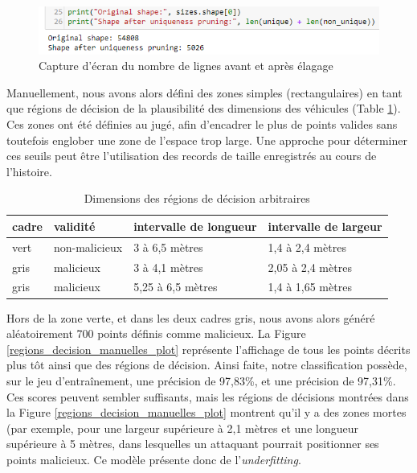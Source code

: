 \documentclass[a4paper]{report}
\begin{document}
\begin{figure}
\centering
\includegraphics[width=\textwidth]{img/screen_shape.png}
\caption{Capture d'écran du nombre de lignes avant et après élagage\label{screen_shape}}
\end{figure}

Manuellement, nous avons alors défini des zones simples (rectangulaires) en tant que régions de décision de la plausibilité des dimensions des véhicules (Table \ref{regions_decision_manuelles_valeurs}). Ces zones ont été définies au jugé, afin d'encadrer le plus de points valides sans toutefois englober une zone de l'espace trop large. Une approche pour déterminer ces seuils peut être l'utilisation des records de taille enregistrés au cours de l'histoire.

\begin{table}[h]
\centering
\begin{tabular}{llll}
cadre & validité & intervalle de longueur & intervalle de largeur \\
\hline
vert & non-malicieux & 3 à 6,5 mètres & 1,4 à 2,4 mètres \\
gris & malicieux & 3 à 4,1 mètres & 2,05 à 2,4 mètres \\
gris & malicieux & 5,25 à 6,5 mètres & 1,4 à 1,65 mètres \\
\end{tabular}
\caption{Dimensions des régions de décision arbitraires\label{regions_decision_manuelles_valeurs}}
\end{table}

Hors de la zone verte, et dans les deux cadres gris, nous avons alors généré aléatoirement 700 points définis comme malicieux. La Figure \ref{regions_decision_manuelles_plot} représente l'affichage de tous les points décrits plus tôt ainsi que des régions de décision. Ainsi faite, notre classification possède, sur le jeu d'entraînement, une précision de 97,83\%, et une précision de 97,31\%. Ces scores peuvent sembler suffisants, mais les régions de décisions montrées dans la Figure \ref{regions_decision_manuelles_plot} montrent qu'il y a des zones mortes (par exemple, pour une largeur supérieure à 2,1 mètres et une longueur supérieure à 5 mètres, dans lesquelles un attaquant pourrait positionner ses points malicieux. Ce modèle présente donc de l'\emph{underfitting}.
\end{document}

